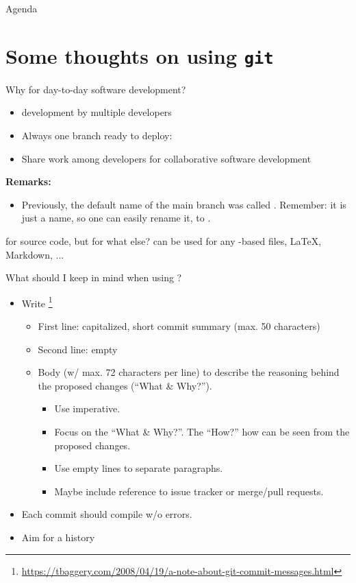 \begin{frame}{Agenda}
\tableofcontents
\end{frame}

\section{Some thoughts on using \texttt{git}}
\begin{frame}{Why  for day-to-day software development?}
\begin{itemize}
\item {} development by multiple developers
\item Always one branch ready to deploy: 
\item Share work among developers for collaborative software development
\end{itemize}

\textbf{Remarks:}
\begin{itemize}
\item Previously, the default name of the main branch was called . Remember: it is just a name, so one can easily rename it, {\eg} to .
\end{itemize}

\begin{block}{ for source code, but for what else?}
 can be used for any -based files, {\eg} \LaTeX, Markdown, ...
\end{block}
\end{frame}

\begin{frame}{What should I keep in mind when using ?}
\begin{itemize}
\item Write \footnote{\scriptsize{\url{https://tbaggery.com/2008/04/19/a-note-about-git-commit-messages.html}}}
\begin{itemize}
\item First line: capitalized, short commit summary (max. 50 characters)
\item Second line: empty
\item Body (w/ max. 72 characters per line) to describe the reasoning behind the proposed changes (``What \& Why?'').
\begin{itemize}
\item Use imperative.
\item Focus on the ``What \& Why?''. The ``How?'' how can be seen from the proposed changes.
\item Use empty lines to separate paragraphs.
\item Maybe include reference to issue tracker or merge/pull requests.
\end{itemize}
\end{itemize}
\item Each commit should compile w/o errors.
\item Aim for a  history
\end{itemize}
\end{frame}

